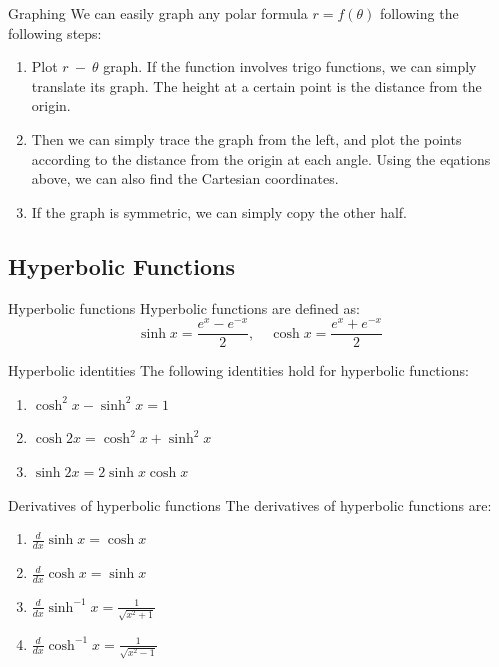 \begin{knBox}
    {Graphing}
    We can easily graph any polar formula $r=f(\theta)$ following the following steps:
    \begin{enumerate}
        \item Plot $r\ -\ \theta$ graph. If the function involves trigo functions, we can simply translate its graph. The height at a certain point is the distance from the origin.
        \item Then we can simply trace the graph from the left, and plot the points according to the distance from the origin at each angle. Using the eqations above, we can also find the Cartesian coordinates.
        \item If the graph is symmetric, we can simply copy the other half.
    \end{enumerate}
\end{knBox}

\subsection{Hyperbolic Functions}
\begin{definition}
    {Hyperbolic functions}
    Hyperbolic functions are defined as:
    \[\sinh x=\frac{e^x-e^{-x}}{2},\quad\cosh x=\frac{e^x+e^{-x}}{2}\]
\end{definition}
\begin{knBox}
    {Hyperbolic identities}
    The following identities hold for hyperbolic functions:
    \begin{enumerate}
        \item $\cosh^2x-\sinh^2x=1$
        \item $\cosh 2x=\cosh^2x+\sinh^2x$
        \item $\sinh 2x=2\sinh x\cosh x$
    \end{enumerate}
\end{knBox}
\begin{knBox}
    {Derivatives of hyperbolic functions}
    The derivatives of hyperbolic functions are:
    \begin{enumerate}
        \item $\frac{d}{dx}\sinh x=\cosh x$
        \item $\frac{d}{dx}\cosh x=\sinh x$
        \item $\frac{d}{dx}\sinh^{-1}x=\frac{1}{\sqrt{x^2+1}}$
        \item $\frac{d}{dx}\cosh^{-1}x=\frac{1}{\sqrt{x^2-1}}$
    \end{enumerate}
\end{knBox}
